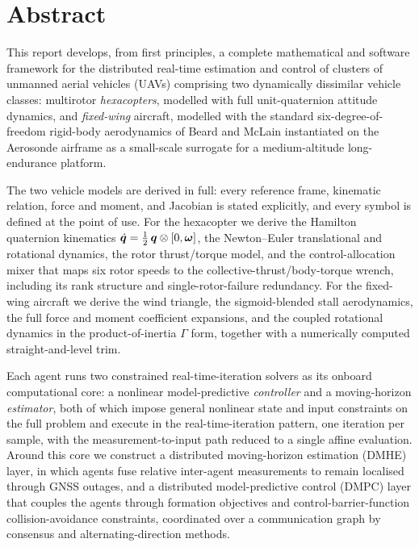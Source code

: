 \chapter*{Abstract}

This report develops, from first principles, a complete mathematical and
software framework for the distributed real-time estimation and control of
clusters of unmanned aerial vehicles (UAVs) comprising two dynamically
dissimilar vehicle classes: multirotor \emph{hexacopters}, modelled with full
unit-quaternion attitude dynamics, and \emph{fixed-wing} aircraft, modelled with
the standard six-degree-of-freedom rigid-body aerodynamics of Beard and McLain
instantiated on the Aerosonde airframe as a small-scale surrogate for a
medium-altitude long-endurance platform.

The two vehicle models are derived in full: every reference frame, kinematic
relation, force and moment, and Jacobian is stated explicitly, and every symbol
is defined at the point of use. For the hexacopter we derive the Hamilton
quaternion kinematics $\dot{\bm{q}}=\tfrac12\,\bm{q}\otimes[0,\bm{\omega}]$,
the Newton--Euler translational and rotational dynamics, the rotor
thrust/torque model, and the control-allocation mixer that maps six rotor
speeds to the collective-thrust/body-torque wrench, including its rank
structure and single-rotor-failure redundancy. For the fixed-wing aircraft we
derive the wind triangle, the sigmoid-blended stall aerodynamics, the full
force and moment coefficient expansions, and the coupled rotational dynamics in
the product-of-inertia $\Gamma$ form, together with a numerically computed
straight-and-level trim.

Each agent runs two constrained real-time-iteration solvers as its onboard
computational core: a nonlinear model-predictive \emph{controller} and a
moving-horizon \emph{estimator}, both of which impose general nonlinear state and
input constraints on the full problem and execute in the real-time-iteration
pattern, one iteration per sample, with the measurement-to-input path reduced to
a single affine evaluation. Around this core we construct
a distributed moving-horizon estimation (DMHE) layer, in which agents fuse
relative inter-agent measurements to remain localised through GNSS outages, and
a distributed model-predictive control (DMPC) layer that couples the agents
through formation objectives and control-barrier-function collision-avoidance
constraints, coordinated over a communication graph by consensus and
alternating-direction methods.

